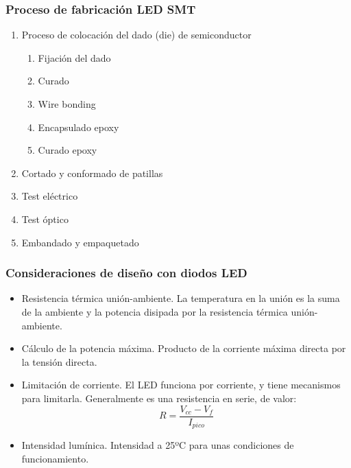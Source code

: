 \subsubsection{Proceso de fabricación LED SMT}
\begin{enumerate}
    \item Proceso de colocación del dado (die) de semiconductor
    \begin{enumerate}
        \item Fijación del dado
        \item Curado
        \item Wire bonding
        \item Encapsulado epoxy
        \item Curado epoxy
    \end{enumerate}
    \item Cortado y conformado de patillas
    \item Test eléctrico
    \item Test óptico
    \item Embandado y empaquetado
\end{enumerate}

\subsubsection{Consideraciones de diseño con diodos LED}

\begin{itemize}
    \item Resistencia térmica unión-ambiente. La temperatura en la unión es la suma de la ambiente y la potencia disipada por la resistencia térmica unión-ambiente.
    \item Cálculo de la potencia máxima. Producto de la corriente máxima directa por la tensión directa.
    \item Limitación de corriente. El LED funciona por corriente, y tiene mecanismos para limitarla. Generalmente es una resistencia en serie, de valor:
    \begin{equation}
        R = \frac{V_{cc} - V_f}{I_{pico}}
    \end{equation}
    \item Intensidad lumínica. Intensidad a 25ºC para unas condiciones de funcionamiento.
\end{itemize}